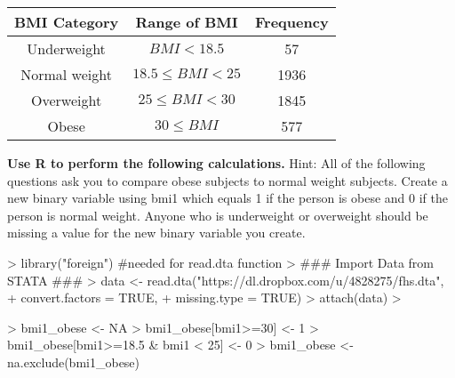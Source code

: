 \documentclass{article}
\begin{document}
\begin{table}[ht]
\begin{center}
\begin{tabular}{ccc}
BMI Category & Range of BMI & Frequency \\
\hline
Underweight   & \(BMI \lt 18.5\)  & 57 \\
Normal weight & \(18.5 \le BMI \lt 25\) & 1936 \\
Overweight    & \(25 \le BMI \lt 30\)   & 1845 \\
Obese         & \(30 \le BMI\)          & 577 \\
\end{tabular}
\end{center}
\end{table}

\textbf{Use R to perform the following calculations.} Hint: All of the following questions ask you to compare obese subjects to normal weight subjects. Create a new binary variable using bmi1 which equals 1 if the person is obese and 0 if the person is normal weight. Anyone who is underweight or overweight should be missing a value for the new binary variable you create.


\begin{Schunk}
\begin{Sinput}
> library("foreign") #needed for read.dta function
> ### Import Data from STATA ###
> data <- read.dta("https://dl.dropbox.com/u/4828275/fhs.dta",
+                  convert.factors = TRUE,
+                  missing.type = TRUE)
> attach(data)
> 
\end{Sinput}
\end{Schunk}


\begin{Schunk}
\begin{Sinput}
> bmi1_obese <- NA 
> bmi1_obese[bmi1>=30] <- 1
> bmi1_obese[bmi1>=18.5 & bmi1 < 25] <- 0
> bmi1_obese <- na.exclude(bmi1_obese)
\end{Sinput}
\end{Schunk}
\end{document}
